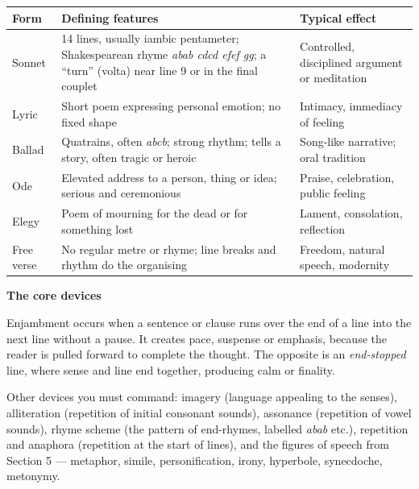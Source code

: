 \documentclass[11pt]{article}
\newcommand{\cle}[1]{{\popxbold\color{popdark}#1}}
\begin{document}
\begin{center}
\begin{tabularx}{\linewidth}{|l|X|X|}
\hline
\rowcolor{popblueL} \textbf{Form} & \textbf{Defining features} & \textbf{Typical effect} \\
\hline
Sonnet & 14 lines, usually iambic pentameter; Shakespearean rhyme \emph{abab cdcd efef gg}; a ``turn'' (\cle{volta}) near line 9 or in the final couplet & Controlled, disciplined argument or meditation \\
\hline
Lyric & Short poem expressing personal emotion; no fixed shape & Intimacy, immediacy of feeling \\
\hline
Ballad & Quatrains, often \emph{abcb}; strong rhythm; tells a story, often tragic or heroic & Song-like narrative; oral tradition \\
\hline
Ode & Elevated address to a person, thing or idea; serious and ceremonious & Praise, celebration, public feeling \\
\hline
Elegy & Poem of mourning for the dead or for something lost & Lament, consolation, reflection \\
\hline
Free verse & No regular metre or rhyme; line breaks and rhythm do the organising & Freedom, natural speech, modernity \\
\hline
\end{tabularx}
\end{center}

\textbf{The core devices}

\begin{definition}[Enjambment]
\cle{Enjambment} occurs when a sentence or clause runs over the end of a line into the next line without a pause. It creates pace, suspense or emphasis, because the reader is pulled forward to complete the thought. The opposite is an \emph{end-stopped} line, where sense and line end together, producing calm or finality.
\end{definition}

Other devices you must command: \cle{imagery} (language appealing to the senses), \cle{alliteration} (repetition of initial consonant sounds), \cle{assonance} (repetition of vowel sounds), \cle{rhyme scheme} (the pattern of end-rhymes, labelled \emph{abab} etc.), \cle{repetition} and \cle{anaphora} (repetition at the start of lines), and the figures of speech from Section 5 — metaphor, simile, personification, irony, hyperbole, synecdoche, metonymy.
\end{document}
